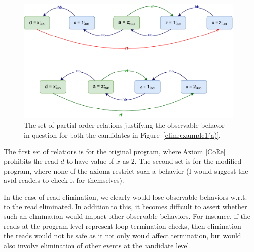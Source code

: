     \begin{figure}[H]
        \centering
        \includegraphics[scale=0.7]{6.Elimination/EliminationExample1(b).pdf}
        \caption{The set of partial order relations justifying the observable behavor in question for both the candidates in Figure~\ref{elim:example1(a)}.} 
        \label{elim:example1(b)}
    \end{figure}


    The first set of relations is for the original program, where Axiom \ref{CoRe} prohibits the read $d$ to have value of $x$ as $2$.
    The second set is for the modified program, where none of the axioms restrict such a behavior (I would suggest the avid readers to check it for themselves).
    
    In the case of read elimination, we clearly would lose observable behaviors w.r.t. to the read eliminated.
    In addition to this, it becomes difficult to assert whether such an elimination would impact other observable behaviors. 
    For instance, if the reads at the program level represent loop termination checks, then elimination the reads would not be safe as it not only would affect termination, but would also involve elimination of other events at the candidate level.
    